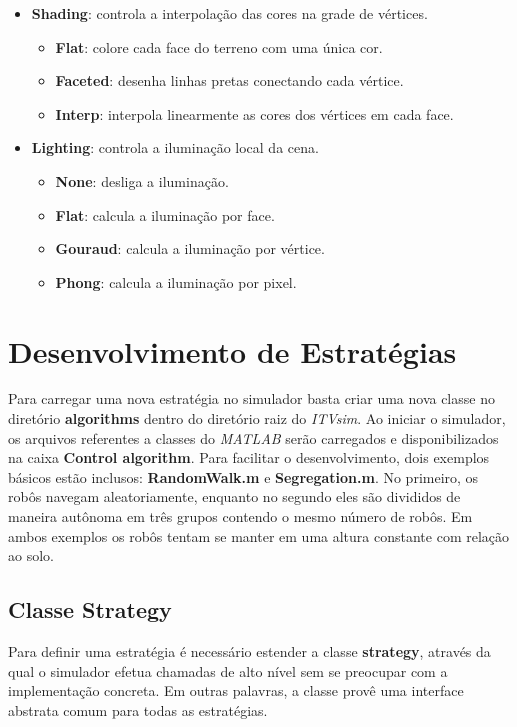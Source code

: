 \documentclass[11pt,a4paper]{article}
\begin{document}
\begin{itemize}
\item \textbf{Shading}: controla a interpolação das cores na grade de vértices.
  \begin{itemize}
  \item \textbf{Flat}: colore cada face do terreno com uma única cor.
  \item \textbf{Faceted}: desenha linhas pretas conectando cada vértice.
  \item\textbf{Interp}: interpola linearmente as cores dos vértices em cada face.
  \end{itemize}

\item \textbf{Lighting}: controla a iluminação local da cena.
  \begin{itemize}
  \item \textbf{None}: desliga a iluminação.
  \item \textbf{Flat}: calcula a iluminação por face.
  \item \textbf{Gouraud}: calcula a iluminação por vértice.
  \item \textbf{Phong}: calcula a iluminação por pixel.
  \end{itemize}
\end{itemize}

\section{Desenvolvimento de Estratégias} 
\label{sec:strategies}

Para carregar uma nova estratégia no simulador basta criar uma nova
classe no diretório \textbf{algorithms} dentro do diretório raiz do
\textit{ITVsim}. Ao iniciar o simulador, os arquivos referentes a
classes do \textit{MATLAB} serão carregados e disponibilizados na
caixa \textbf{Control algorithm}. Para facilitar o desenvolvimento,
dois exemplos básicos estão inclusos: \textbf{RandomWalk.m} e
\textbf{Segregation.m}. No primeiro, os robôs navegam aleatoriamente,
enquanto no segundo eles são divididos de maneira autônoma em três
grupos contendo o mesmo número de robôs. Em ambos exemplos os robôs
tentam se manter em uma altura constante com relação ao solo.

\subsection{Classe Strategy}

Para definir uma estratégia é necessário estender a classe
\textbf{strategy}, através da qual o simulador efetua chamadas de alto
nível sem se preocupar com a implementação concreta. Em outras
palavras, a classe provê uma interface abstrata comum para todas as estratégias.
\end{document}
